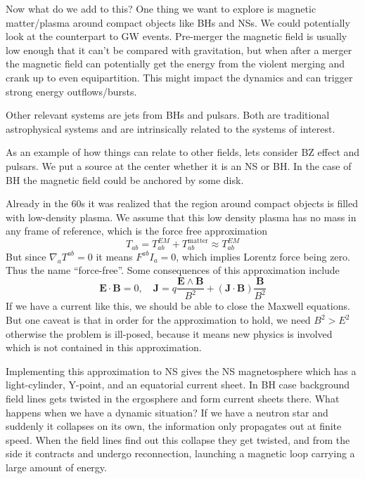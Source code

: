 \documentclass[letterpaper, 11pt]{article}
\numberwithin{equation}{section}
\numberwithin{figure}{section}
\begin{document}
Now what do we add to this? One thing we want to explore is magnetic
matter/plasma around compact objects like BHs and NSs. We could potentially look
at the counterpart to GW events. Pre-merger the magnetic field is usually low
enough that it can't be compared with gravitation, but when after a merger the
magnetic field can potentially get the energy from the violent merging and crank
up to even equipartition. This might impact the dynamics and can trigger strong
energy outflows/bursts.

Other relevant systems are jets from BHs and pulsars. Both are traditional
astrophysical systems and are intrinsically related to the systems of interest.

As an example of how things can relate to other fields, lets consider BZ effect
and pulsars. We put a source at the center whether it is an NS or BH. In the
case of BH the magnetic field could be anchored by some disk.

Already in the 60s it was realized that the region around compact objects is
filled with low-density plasma. We assume that this low density plasma has no
mass in any frame of reference, which is the force free approximation
\begin{equation}
  \label{eq:39}
  T_{ab} = T_{ab}^{EM} + T_{ab}^\mathrm{matter} \approx T_{ab}^{EM}
\end{equation}
But since $\nabla_{a} T^{ab} = 0$ it means $F^{ab}I_a = 0$, which implies
Lorentz force being zero. Thus the name ``force-free''. Some consequences
of this approximation include
\begin{equation}
  \label{eq:40}
  \mathbf{E}\cdot \mathbf{B} = 0, \quad \mathbf{J} = q\frac{\mathbf{E}\wedge \mathbf{B}}{B^2} + (\mathbf{J}\cdot \mathbf{B})\frac{\mathbf{B}}{B^2}
\end{equation}
If we have a current like this, we should be able to close the Maxwell
equations. But one caveat is that in order for the approximation to hold, we
need $B^2 > E^2$ otherwise the problem is ill-posed, because it means new
physics is involved which is not contained in this approximation.

Implementing this approximation to NS gives the NS magnetosphere which has a
light-cylinder, Y-point, and an equatorial current sheet. In BH case background
field lines gets twisted in the ergosphere and form current sheets there. What
happens when we have a dynamic situation? If we have a neutron star and suddenly
it collapses on its own, the information only propagates out at finite speed.
When the field lines find out this collapse they get twisted, and from the side
it contracts and undergo reconnection, launching a magnetic loop carrying a
large amount of energy. 
\end{document}
